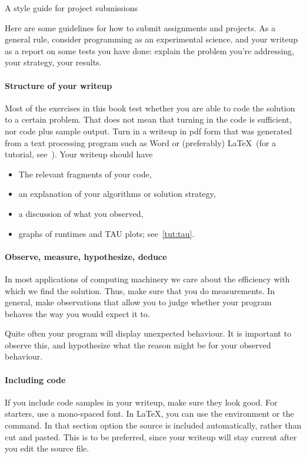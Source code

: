  {A style guide for project submissions}

Here are some guidelines for how to submit assignments and projects.
As a general rule, consider programming as an experimental science,
and your writeup as a report on some tests you have done: explain
the problem you're addressing, your strategy, your results.

\paragraph*{\bf Structure of your writeup}

Most of the exercises in this book test whether you are able to code the solution to a certain
problem. That does not mean that turning in the code is sufficient, nor code plus sample output.
Turn in a writeup in pdf form that was generated from a text processing program such as Word or (preferably)
\LaTeX\ (for a tutorial, see~). Your writeup should have 
\begin{itemize}
\item The relevant fragments of your code,
\item an explanation of your algorithms or solution strategy,
\item a discussion of what you observed,
\item graphs of runtimes and TAU plots; see~\ref{tut:tau}.
\end{itemize}

\paragraph*{Observe, measure, hypothesize, deduce}

In most applications of computing machinery we care about the efficiency with which
we find the solution. Thus, make sure that you do measurements. In general, make
observations that allow you to judge whether your program behaves the way you
would expect it to.

Quite often your program will display unexpected behaviour. It is important to observe
this, and hypothesize what the reason might be for your observed behaviour.

\paragraph*{Including code}

If you include code samples in your writeup, make sure they look good. For starters,
use a mono-spaced font. In \LaTeX, you can use the  environment or the 
 command. In that section option the source is included automatically,
rather than cut and pasted. This is to be preferred, since your writeup will
stay current after you edit the source file.

